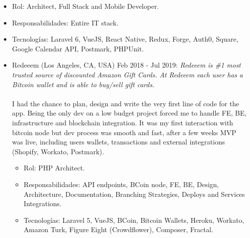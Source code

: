 \documentclass[11pt,a4paper,sans]{moderncv}        %
\begin{document}
{\begin{itemize}
    \begin{itemize}
      \item Rol: Architect, Full Stack and Mobile Developer.
      \item Responsabilidades: Entire IT stack.
      \item Tecnologías: Laravel 6, VueJS, React Native, Redux, Forge, Auth0, Square, Google Calendar API, Postmark, PHPUnit.
    \end{itemize}
  \end{itemize}
  \bigskip
  \begin{itemize}
    \item Redeeem (Los Angeles, CA, USA) Feb 2018 - Jul 2019:
    \textit{Redeeem is \#1 most trusted source of discounted Amazon Gift Cards. At Redeeem each user has a Bitcoin wallet and is able to buy/sell gift cards.}\\
    \\I had the chance to plan, design and write the very first line of code for the app. Being the only dev on a low budget project forced me to handle FE, BE, infrastructure and blockchain integration. It was my first interaction with bitcoin node but dev process was smooth and fast, after a few weeks MVP was live, including users wallets, transactions and external integrations (Shopify, Workato, Postmark).\\
    \begin{itemize}
      \item Rol: PHP Architect.
      \item Responsabilidades: API endpoints, BCoin node, FE, BE, Design, Architecture, Documentation, Branching Strategies, Deploys and Services Integrations.
      \item Tecnologías: Laravel 5, VueJS, BCoin, Bitcoin Wallets, Heroku, Workato, Amazon Turk, Figure Eight (Crowdflower), Composer, Fractal.
    \end{itemize}
  \end{itemize}
}
\end{document}
